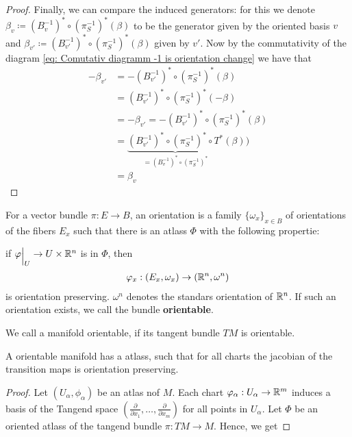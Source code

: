 \begin{proof}
Finally, we can compare the induced generators: for this we denote $\beta_v\coloneq (B_{v}^{-1})^*\circ (\pi^{-1}_S)^*(\beta)$ to be the generator given by the oriented basis $v$ and $\beta_{v'}\coloneq (B_{v'}^{-1})^*\circ (\pi^{-1}_S)^*(\beta)$ given by $v'$. Now by the commutativity of the diagram \ref{eq: Comutativ diagramm -1 is orientation change} we have that 
\begin{align*}
    -\beta_{v'} 
    &= -(B_{v'}^{-1})^*\circ (\pi^{-1}_S)^*(\beta) \\
    &= (B_{v'}^{-1})^*\circ (\pi^{-1}_S)^*(-\beta)\\
    &= -\beta_{v'}=-(B_{v'}^{-1})^*\circ (\pi^{-1}_S)^*(\beta)\\
    &= \underbrace{(B_{v'}^{-1})^*\circ (\pi^{-1}_S)^*\circ T^*}_{=(B_{v}^{-1})^*\circ (\pi^{-1}_S)^*}(\beta))\\
    &= \beta_v
\end{align*}
\end{proof}
\begin{definition}
For a  vector bundle $\pi:E\to B$, an orientation is a family $\{ \omega_x \}_{x\in B}$ of orientations of the fibers $E_x$ such that there is an atlass $\Phi$ with the following propertie:

if $\phi \einsch{U}\to U\times \R^n$ is in $\Phi$, then 
\begin{align*}
	\varphi_x : (E_x,\omega_x) \to (\mathbb{R}^n,\omega^n)
\end{align*} is orientation preserving. $\omega^n$ denotes the standars orientation of $\mathbb{R}^n$. If such an orientation exists, we call the bundle \textbf{orientable}.
\end{definition}
\begin{definition}
	We call a manifold orientable, if its tangent bundle $TM$ is orientable. 
\end{definition}
\begin{cor}
	A orientable manifold has a atlass, such that for all charts the jacobian of the transition maps is orientation preserving.
\end{cor}
\begin{proof}
	Let $(U_{\alpha},\phi_\alpha)$ be an atlas nof $M$. Each chart $\varphi_\alpha:U_\alpha \to \mathbb{R}^m$ induces a basis of the Tangend space $(\frac{\partial}{\partial x_1},\dots , \frac{\partial}{\partial x_m})$ for all points in $U_\alpha$. 
	Let $\Phi$ be an oriented atlass of the tangend bundle $\pi:TM\to M$. Hence, we get 
\end{proof}